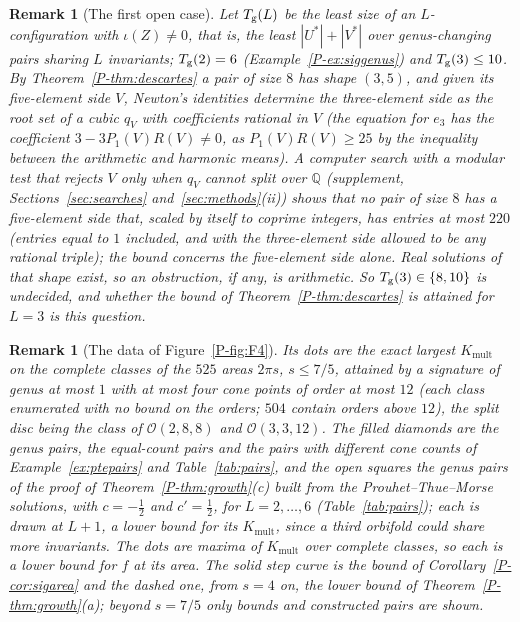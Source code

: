 \documentclass[pdflatex,sn-mathphys-num]{sn-jnl}
\newcommand{\Orb}{\mathcal{O}}
\newcommand{\Q}{\mathbb{Q}}
\newcommand{\pref}[1]{\ref*{P-#1}}%
\newcommand{\Kmult}{K_{\mathrm{mult}}}
\theoremstyle{thmstyleone}%
\theoremstyle{thmstylethree}%
\newtheorem{remark}[proposition]{Remark}%
\providecommand{\Orb}{\mathcal{O}}
\providecommand{\Kmult}{K_{\mathrm{mult}}}
\providecommand{\Q}{\mathbb{Q}}
\begin{document}
\begin{remark}[The first open case]\label{rem:T3}
Let $T_{\rm g}(L)$ be the least size of an $L$-configuration with $\iota(Z)\ne0$, that is, the least $|U^*|+|V^*|$ over genus-changing pairs sharing $L$ invariants; $T_{\rm g}(2)=6$ (Example~\pref{ex:siggenus}) and $T_{\rm g}(3)\le10$. By Theorem~\pref{thm:descartes} a pair of size $8$ has shape $(3,5)$, and given its five-element side $V$, Newton's identities determine the three-element side as the root set of a cubic $q_V$ with coefficients rational in $V$ (the equation for $e_3$ has the coefficient $3-3P_1(V)R(V)\ne0$, as $P_1(V)R(V)\ge25$ by the inequality between the arithmetic and harmonic means). A computer search with a modular test that rejects $V$ only when $q_V$ cannot split over $\Q$ (supplement, Sections~\ref{sec:searches} and~\ref{sec:methods}(ii)) shows that no pair of size $8$ has a five-element side that, scaled by itself to coprime integers, has entries at most $220$ (entries equal to $1$ included, and with the three-element side allowed to be any rational triple); the bound concerns the five-element side alone. Real solutions of that shape exist, so an obstruction, if any, is arithmetic. So $T_{\rm g}(3)\in\{8,10\}$ is undecided, and whether the bound of Theorem~\pref{thm:descartes} is attained for $L=3$ is this question.
\end{remark}

\begin{remark}[The data of Figure~\pref{fig:F4}]\label{rem:F4data}
Its dots are the exact largest $\Kmult$ on the complete classes of the $525$ areas $2\pi s$, $s\le7/5$, attained by a signature of genus at most $1$ with at most four cone points of order at most $12$ (each class enumerated with no bound on the orders; $504$ contain orders above $12$), the split disc being the class of $\Orb(2,8,8)$ and $\Orb(3,3,12)$. The filled diamonds are the genus pairs, the equal-count pairs and the pairs with different cone counts of Example~\ref{ex:ptepairs} and Table~\ref{tab:pairs}, and the open squares the genus pairs of the proof of Theorem~\pref{thm:growth}(c) built from the Prouhet--Thue--Morse solutions, with $c=-\frac12$ and $c'=\frac12$, for $L=2,\dots,6$ (Table~\ref{tab:pairs}); each is drawn at $L+1$, a lower bound for its $\Kmult$, since a third orbifold could share more invariants. The dots are maxima of $\Kmult$ over complete classes, so each is a lower bound for $f$ at its area. The solid step curve is the bound of Corollary~\pref{cor:sigarea} and the dashed one, from $s=4$ on, the lower bound of Theorem~\pref{thm:growth}(a); beyond $s=7/5$ only bounds and constructed pairs are shown.
\end{remark}
\end{document}
